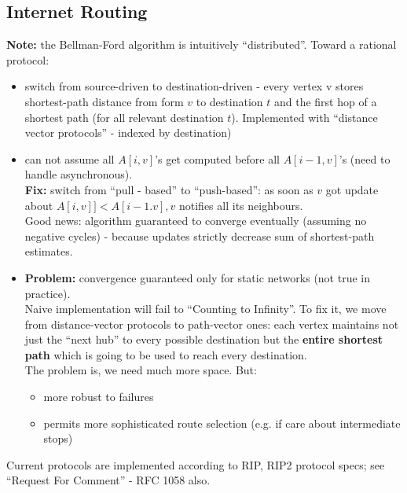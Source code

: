 \documentclass{scrartcl}
\begin{document}
\subsection{Internet Routing}
\label{sec:14-7} {\bf Note: } the Bellman-Ford algorithm is intuitively
``distributed''. Toward a rational protocol:
\begin{itemize}
\item switch from source-driven to destination-driven - every vertex v stores
  shortest-path distance from form $v$ to destination $t$ and the first hop of a
  shortest path (for all relevant destination $t$). Implemented with ``distance
  vector protocols'' - indexed by destination)
\item can not assume all $A[i, v]$'s get computed before all $A[i-1, v]$'s (need
  to handle asynchronous).\\
  {\bf Fix: } switch from ``pull - based'' to ``push-based'': as soon as $v$ got
  update about $A[i, v]] < A[i-1. v], v$ notifies all its neighbours.\\
  Good news: algorithm guaranteed to converge eventually (assuming no negative
  cycles) - because updates strictly decrease sum of shortest-path estimates.
\item {\bf Problem: } convergence guaranteed only for static networks (not true
  in practice).\\
  Naive implementation will fail to ``Counting to Infinity''. To fix it, we move
  from distance-vector protocols to path-vector ones: each vertex maintains not
  just the ``next hub'' to every possible destination but the {\bf entire
    shortest
    path} which is going to be used to reach every destination.\\
  The problem is, we need much more space. But:
  \begin{itemize}
  \item more robust to failures
  \item permits more sophisticated route selection (e.g. if care about
    intermediate stops)
  \end{itemize}
\end{itemize}
Current protocols are implemented according to RIP, RIP2 protocol specs; see
``Request For Comment'' - RFC 1058 also.

\end{document}
